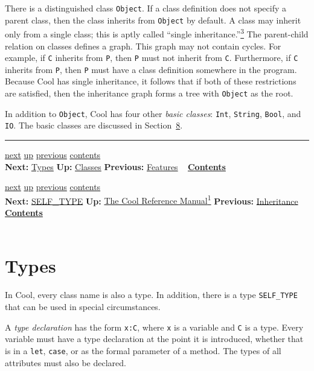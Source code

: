 \documentclass[]{article}
\begin{document}
There is a distinguished class \texttt{Object}. If a class definition
does not specify a parent class, then the class inherits from
\texttt{Object} by default. A class may inherit only from a single
class; this is aptly called ``single
inheritance.''\href{footnode.html\#foot386}{\textsuperscript{3}} The
parent-child relation on classes defines a graph. This graph may not
contain cycles. For example, if \texttt{C} inherits from \texttt{P},
then \texttt{P} must not inherit from \texttt{C}. Furthermore, if
\texttt{C} inherits from \texttt{P}, then \texttt{P} must have a class
definition somewhere in the program. Because Cool has single
inheritance, it follows that if both of these restrictions are
satisfied, then the inheritance graph forms a tree with \texttt{Object}
as the root.

In addition to \texttt{Object}, Cool has four other \emph{basic
classes}: \texttt{Int}, \texttt{String}, \texttt{Bool}, and \texttt{IO}.
The basic classes are discussed in
Section~\href{node26.html\#sec-basic}{8}.

\begin{center}\rule{3in}{0.4pt}\end{center}

\href{node7.html}{next} \href{node4.html}{up}
\href{node5.html}{previous} \href{node1.html}{contents} \\
\textbf{Next:} \href{node7.html}{Types} \textbf{Up:}
\href{node4.html}{Classes} \textbf{Previous:}
\href{node5.html}{Features} ~ \textbf{\href{node1.html}{Contents}}

\href{node8.html}{next} \href{cool-manual.html}{up}
\href{node6.html}{previous} \href{node1.html}{contents} \\
\textbf{Next:} \href{node8.html}{SELF\_TYPE} \textbf{Up:}
\href{cool-manual.html}{The Cool Reference Manual\textsuperscript{1}}
\textbf{Previous:} \href{node6.html}{Inheritance} ~
\textbf{\href{node1.html}{Contents}} \\ \\

\section{Types}

In Cool, every class name is also a type. In addition, there is a type
\texttt{SELF\_TYPE} that can be used in special circumstances.

A \emph{type declaration} has the form \texttt{x:C}, where \texttt{x} is
a variable and \texttt{C} is a type. Every variable must have a type
declaration at the point it is introduced, whether that is in a
\texttt{let}, \texttt{case}, or as the formal parameter of a method. The
types of all attributes must also be declared.
\end{document}
